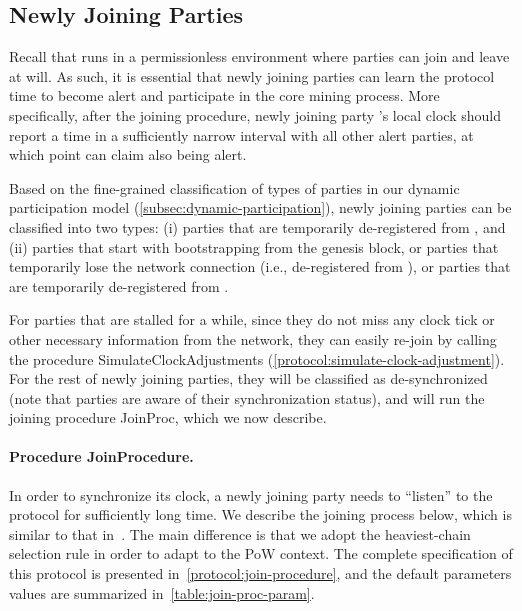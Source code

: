 \subsection{Newly Joining Parties}
\label{subsec:newly-joint-parties}

Recall that \timekeeper runs in a permissionless environment where parties can join and leave at will.
%
As such, it is essential that newly joining parties can learn the protocol time to become alert and participate in the core mining process.
%
More specifically, after the joining procedure, newly joining party \party's local clock should report a time in a sufficiently narrow interval with all other alert parties, at which point \party can claim also being alert.

Based on the fine-grained classification of types of parties in our dynamic participation model (\cref{subsec:dynamic-participation}), newly joining parties can be classified into two types: (i) parties that are temporarily de-registered from \funcRO, and (ii) parties that start with bootstrapping from the genesis block, or parties that temporarily lose the network connection (i.e., de-registered from \funcDiffuse), or parties that are temporarily de-registered from \funcImpClock.

For parties that are stalled for a while, since they do not miss any clock tick or other necessary information from the network, they can easily re-join by calling the procedure \textsf{SimulateClockAdjustments} (\cref{protocol:simulate-clock-adjustment}).
%
For the rest of newly joining parties, they will be classified as de-synchronized (note that parties are aware of their synchronization status), and will run the joining procedure \textsf{JoinProc}, which we now describe.

\paragraph{Procedure \textsf{JoinProcedure}.}
%
In order to synchronize its clock, a newly joining party \party needs to ``listen'' to the protocol for sufficiently long time.
%
We describe the joining process below, which is similar to that in~\cite{EC:BGKRZ21}.
%
The main difference is that we adopt the heaviest-chain selection rule in order to adapt to the PoW context.
%
The complete specification of this protocol is presented in~\cref{protocol:join-procedure}, and the default parameters values are summarized in~\cref{table:join-proc-param}.



